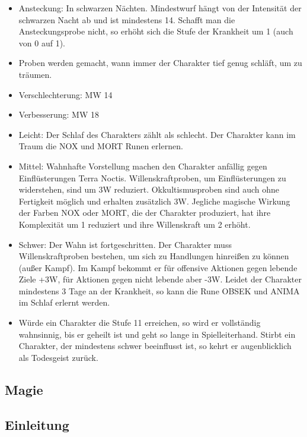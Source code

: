 \documentclass{article}
\begin{document}
\begin{itemize}
\item Ansteckung: In schwarzen Nächten. Mindestwurf hängt von der Intensität der schwarzen Nacht ab und ist mindestens 14. Schafft man die Ansteckungsprobe nicht, so erhöht sich die Stufe der Krankheit um 1 (auch von 0 auf 1).
\item Proben werden gemacht, wann immer der Charakter tief genug schläft, um zu träumen.
\item Verschlechterung: MW 14
\item Verbesserung: MW 18
\item Leicht: Der Schlaf des Charakters zählt als schlecht. Der Charakter kann im Traum die NOX und MORT Runen erlernen.
\item Mittel: Wahnhafte Vorstellung machen den Charakter anfällig gegen Einflüsterungen Terra Noctis. Willenskraftproben, um Einflüsterungen zu widerstehen, sind um 3W reduziert. Okkultismusproben sind auch ohne Fertigkeit möglich und erhalten zusätzlich 3W. Jegliche magische Wirkung der Farben NOX oder MORT, die der Charakter produziert, hat ihre Komplexität um 1 reduziert und ihre Willenskraft um 2 erhöht.
\item Schwer: Der Wahn ist fortgeschritten. Der Charakter muss Willenskraftproben bestehen, um sich zu Handlungen hinreißen zu können (außer Kampf). Im Kampf bekommt er für offensive Aktionen gegen lebende Ziele +3W, für Aktionen gegen nicht lebende aber -3W. Leidet der Charakter mindestens 3 Tage an der Krankheit, so kann die Rune OBSEK und ANIMA im Schlaf erlernt werden.
\item Würde ein Charakter die Stufe 11 erreichen, so wird er vollständig wahnsinnig, bis er geheilt ist und geht so lange in Spielleiterhand. Stirbt ein Charakter, der mindestens schwer beeinflusst ist, so kehrt er augenblicklich als Todesgeist zurück.
\end{itemize}

\begin{center}
\section{Magie}
\end{center}

\begin{center}
\subsection{Einleitung}
\end{center}
\end{document}

